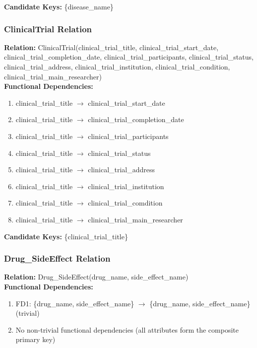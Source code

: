 \documentclass[12pt,a4paper]{article}
\begin{document}
\textbf{Candidate Keys:} \{disease\_name\}

\subsubsection{ClinicalTrial Relation}
\textbf{Relation:} ClinicalTrial(clinical\_trial\_title, clinical\_trial\_start\_date, clinical\_trial\_completion\_date, clinical\_trial\_participants, clinical\_trial\_status, clinical\_trial\_address, clinical\_trial\_institution, clinical\_trial\_condition, clinical\_trial\_main\_researcher)\\

\textbf{Functional Dependencies:}
\begin{enumerate}
    \item clinical\_trial\_title $\rightarrow$ clinical\_trial\_start\_date
    \item clinical\_trial\_title $\rightarrow$ clinical\_trial\_completion\_date
    \item clinical\_trial\_title $\rightarrow$ clinical\_trial\_participants
    \item clinical\_trial\_title $\rightarrow$ clinical\_trial\_status
    \item clinical\_trial\_title $\rightarrow$ clinical\_trial\_address
    \item clinical\_trial\_title $\rightarrow$ clinical\_trial\_institution
    \item clinical\_trial\_title $\rightarrow$ clinical\_trial\_comdition
    \item clinical\_trial\_title $\rightarrow$ clinical\_trial\_main\_researcher
\end{enumerate}

\textbf{Candidate Keys:} \{clinical\_trial\_title\}


\subsubsection{Drug\_SideEffect Relation}
\textbf{Relation:} Drug\_SideEffect(drug\_name, side\_effect\_name)\\

\textbf{Functional Dependencies:}
\begin{enumerate}
    \item FD1: \{drug\_name, side\_effect\_name\} $\rightarrow$ \{drug\_name, side\_effect\_name\} (trivial)
    \item No non-trivial functional dependencies (all attributes form the composite primary key)
\end{enumerate}
\end{document}
